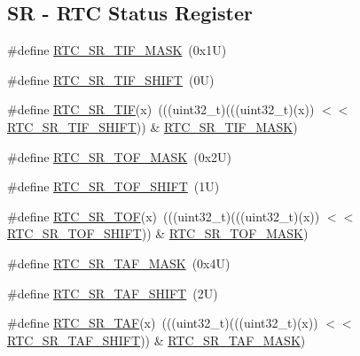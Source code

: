 \subsection*{SR -\/ R\+TC Status Register}
\begin{DoxyCompactItemize}
\item 
\#define \mbox{\hyperlink{group___r_t_c___register___masks_ga1efc73171f80fa079f4d3aec43f2faab}{R\+T\+C\+\_\+\+S\+R\+\_\+\+T\+I\+F\+\_\+\+M\+A\+SK}}~(0x1\+U)
\item 
\#define \mbox{\hyperlink{group___r_t_c___register___masks_ga261718ed362a6c56ad4c0e1c5e624552}{R\+T\+C\+\_\+\+S\+R\+\_\+\+T\+I\+F\+\_\+\+S\+H\+I\+FT}}~(0\+U)
\item 
\#define \mbox{\hyperlink{group___r_t_c___register___masks_gab119307a38d942f76aa92ff953520ff7}{R\+T\+C\+\_\+\+S\+R\+\_\+\+T\+IF}}(x)~(((uint32\+\_\+t)(((uint32\+\_\+t)(x)) $<$$<$ \mbox{\hyperlink{group___r_t_c___register___masks_ga261718ed362a6c56ad4c0e1c5e624552}{R\+T\+C\+\_\+\+S\+R\+\_\+\+T\+I\+F\+\_\+\+S\+H\+I\+FT}})) \& \mbox{\hyperlink{group___r_t_c___register___masks_ga1efc73171f80fa079f4d3aec43f2faab}{R\+T\+C\+\_\+\+S\+R\+\_\+\+T\+I\+F\+\_\+\+M\+A\+SK}})
\item 
\#define \mbox{\hyperlink{group___r_t_c___register___masks_gabadca56816c485ca12134cd54a40c010}{R\+T\+C\+\_\+\+S\+R\+\_\+\+T\+O\+F\+\_\+\+M\+A\+SK}}~(0x2\+U)
\item 
\#define \mbox{\hyperlink{group___r_t_c___register___masks_ga209c228a9376a460fa905e67716ebe65}{R\+T\+C\+\_\+\+S\+R\+\_\+\+T\+O\+F\+\_\+\+S\+H\+I\+FT}}~(1\+U)
\item 
\#define \mbox{\hyperlink{group___r_t_c___register___masks_gad807b2dce6068d9e34b9403f3a213681}{R\+T\+C\+\_\+\+S\+R\+\_\+\+T\+OF}}(x)~(((uint32\+\_\+t)(((uint32\+\_\+t)(x)) $<$$<$ \mbox{\hyperlink{group___r_t_c___register___masks_ga209c228a9376a460fa905e67716ebe65}{R\+T\+C\+\_\+\+S\+R\+\_\+\+T\+O\+F\+\_\+\+S\+H\+I\+FT}})) \& \mbox{\hyperlink{group___r_t_c___register___masks_gabadca56816c485ca12134cd54a40c010}{R\+T\+C\+\_\+\+S\+R\+\_\+\+T\+O\+F\+\_\+\+M\+A\+SK}})
\item 
\#define \mbox{\hyperlink{group___r_t_c___register___masks_ga8deec41a2823788375ed7b8b63870868}{R\+T\+C\+\_\+\+S\+R\+\_\+\+T\+A\+F\+\_\+\+M\+A\+SK}}~(0x4\+U)
\item 
\#define \mbox{\hyperlink{group___r_t_c___register___masks_gaaae3f647015906bacdb13124a50d3cfb}{R\+T\+C\+\_\+\+S\+R\+\_\+\+T\+A\+F\+\_\+\+S\+H\+I\+FT}}~(2\+U)
\item 
\#define \mbox{\hyperlink{group___r_t_c___register___masks_gaba0bf9515e6e6dd37ca03b337f068bb1}{R\+T\+C\+\_\+\+S\+R\+\_\+\+T\+AF}}(x)~(((uint32\+\_\+t)(((uint32\+\_\+t)(x)) $<$$<$ \mbox{\hyperlink{group___r_t_c___register___masks_gaaae3f647015906bacdb13124a50d3cfb}{R\+T\+C\+\_\+\+S\+R\+\_\+\+T\+A\+F\+\_\+\+S\+H\+I\+FT}})) \& \mbox{\hyperlink{group___r_t_c___register___masks_ga8deec41a2823788375ed7b8b63870868}{R\+T\+C\+\_\+\+S\+R\+\_\+\+T\+A\+F\+\_\+\+M\+A\+SK}})
$$
\end{DoxyCompactItemize}
